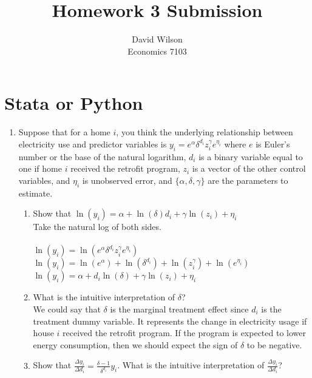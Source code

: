 \documentclass{article}
\title{Homework 3 Submission}
\author{David Wilson \\ Economics 7103}
\begin{document}
  
\maketitle

\section*{Stata or Python}



\begin{enumerate}
\item Suppose that for a home $i$, you think the underlying relationship between electricity use and predictor variables is $y_i=e^\alpha\delta^{d_i}z_i^{\gamma}e^{\eta_i}$ where $e$ is Euler's number or the base of the natural logarithm, $d_i$ is a binary variable equal to one if home $i$ received the retrofit program, $z_i$ is a vector of the other control variables, and $\eta_i$ is unobserved error, and $\{\alpha,\delta,\gamma\}$ are the parameters to estimate.

\begin{enumerate}
    \item Show that $\ln(y_i)=\alpha+\ln(\delta)d_i+\gamma\ln(z_i)+\eta_i$\\
    Take the natural log of both sides.\\
    \\
        $\ln(y_i)=\ln(e^\alpha\delta^{d_i}z_i^{\gamma}e^{\eta_i})$\\
        $\ln(y_i)=\ln(e^\alpha)+\ln(\delta^{d_i})+\ln(z_i^{\gamma})+\ln(e^{\eta_i})$\\
        $\ln(y_i)=\alpha+d_i\ln(\delta)+\gamma\ln(z_i)+\eta_i$\\
    
    
    \item  What is the intuitive interpretation of $\delta$?\\
    We could say that $\delta$ is the marginal treatment effect since $d_i$ is the treatment dummy variable. It represents the change in electricity usage if house $i$ received the retrofit program. If the program is expected to lower energy consumption, then we should expect the sign of $\delta$ to be negative.\\
    \item Show that $\frac{\Delta y_i}{\Delta d_i}=\frac{\delta-1}{\delta^{d_i}}y_i$. What is the intuitive interpretation of $\frac{\Delta y_i}{\Delta d_i}$?\\
    \\


\end{enumerate}
\end{enumerate}
\end{document}
